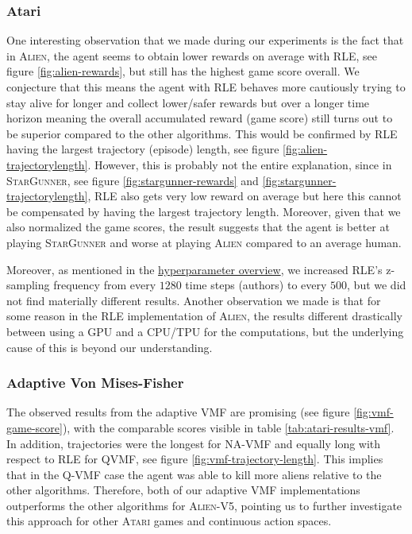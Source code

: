 \documentclass[10pt]{article} %
\begin{document}
\subsubsection{Atari}

One interesting observation that we made during our experiments is the fact that in \textsc{Alien}, the agent seems to obtain lower rewards on average with \textsc{RLE}, see figure \ref{fig:alien-rewards}, but still has the highest game score overall. We conjecture that this means the agent with \textsc{RLE} behaves more cautiously trying to stay alive for longer and collect lower/safer rewards but over a longer time horizon meaning the overall accumulated reward (game score) still turns out to be superior compared to the other algorithms. This would be confirmed by \textsc{RLE} having the largest trajectory (episode) length, see figure \ref{fig:alien-trajectorylength}. However, this is probably not the entire explanation, since in \textsc{StarGunner}, see figure \ref{fig:stargunner-rewards} and \ref{fig:stargunner-trajectorylength}, \textsc{RLE} also gets very low reward on average but here this cannot be compensated by having the largest trajectory length. Moreover, given that we also normalized the game scores, the result suggests that the agent is better at playing \textsc{StarGunner} and worse at playing \textsc{Alien} compared to an average human.

\noindent Moreover, as mentioned in the \hyperlink{hyperparameter-subsection}{hyperparameter overview}, we increased \textsc{RLE}'s z-sampling frequency from every $1280$ time steps (authors) to every $500$, but we did not find materially different results. Another observation we made is that for some reason in the \textsc{RLE} implementation of \textsc{Alien}, the results different drastically between using a GPU and a CPU/TPU for the computations, but the underlying cause of this is beyond our understanding.

\subsubsection{Adaptive Von Mises-Fisher}
The observed results from the adaptive VMF are promising (see figure \ref{fig:vmf-game-score}), with the comparable scores visible in table \ref{tab:atari-results-vmf}. In addition, trajectories were the longest for NA-VMF and equally long with respect to \textsc{RLE} for QVMF, see figure \ref{fig:vmf-trajectory-length}. This implies that 
in the Q-VMF case the agent was able to kill more aliens relative to the other algorithms. Therefore, both of our adaptive VMF implementations outperforms the other algorithms for 
\textsc{Alien-V5}, pointing us to further investigate this approach for other \textsc{Atari} games and continuous action spaces.  
\end{document}
